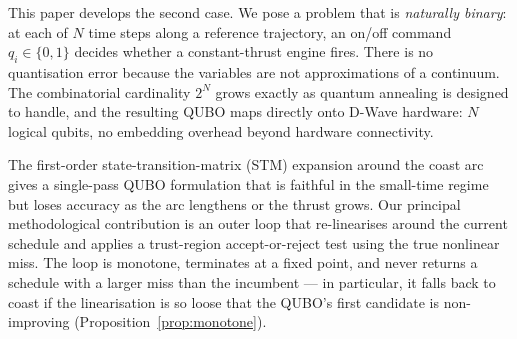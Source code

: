 \documentclass[11pt,a4paper]{article}
\theoremstyle{plain}
\begin{document}
This paper develops the second case. We pose a problem that is
\emph{naturally binary}: at each of $N$ time steps along a reference
trajectory, an on/off command $q_i \in \{0,1\}$ decides whether
a constant-thrust engine fires. There is no quantisation error
because the variables are not approximations of a continuum. The combinatorial cardinality
$2^N$ grows exactly as quantum annealing is designed to handle, and
the resulting QUBO maps directly onto D-Wave hardware: $N$ logical
qubits, no embedding overhead beyond hardware connectivity.

The first-order state-transition-matrix (STM) expansion around the
coast arc gives a single-pass QUBO formulation that is faithful in
the small-time regime but loses accuracy as the arc lengthens or the
thrust grows. Our principal methodological contribution is an
outer loop that re-linearises around the current schedule and
applies a trust-region accept-or-reject test using the true
nonlinear miss. The loop is monotone, terminates at a fixed point,
and never returns a schedule with a larger miss than the
incumbent --- in particular, it falls back to coast if the
linearisation is so loose that the QUBO's first candidate is
non-improving (Proposition~\ref{prop:monotone}).
\end{document}
